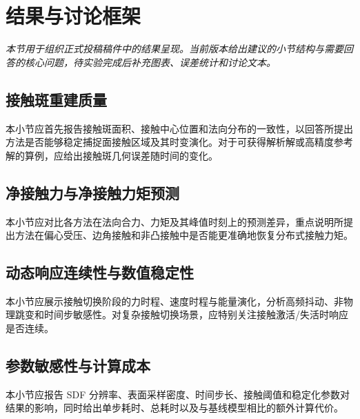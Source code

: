 \section{结果与讨论框架}
\textit{本节用于组织正式投稿稿件中的结果呈现。当前版本给出建议的小节结构与需要回答的核心问题，待实验完成后补充图表、误差统计和讨论文本。}

\subsection{接触斑重建质量}
本小节应首先报告接触斑面积、接触中心位置和法向分布的一致性，以回答所提出方法是否能够稳定捕捉面接触区域及其时变演化。对于可获得解析解或高精度参考解的算例，应给出接触斑几何误差随时间的变化。

\subsection{净接触力与净接触力矩预测}
本小节应对比各方法在法向合力、力矩及其峰值时刻上的预测差异，重点说明所提出方法在偏心受压、边角接触和非凸接触中是否能更准确地恢复分布式接触力矩。

\subsection{动态响应连续性与数值稳定性}
本小节应展示接触切换阶段的力时程、速度时程与能量演化，分析高频抖动、非物理跳变和时间步敏感性。对复杂接触切换场景，应特别关注接触激活/失活时响应是否连续。

\subsection{参数敏感性与计算成本}
本小节应报告 SDF 分辨率、表面采样密度、时间步长、接触阈值和稳定化参数对结果的影响，同时给出单步耗时、总耗时以及与基线模型相比的额外计算代价。
